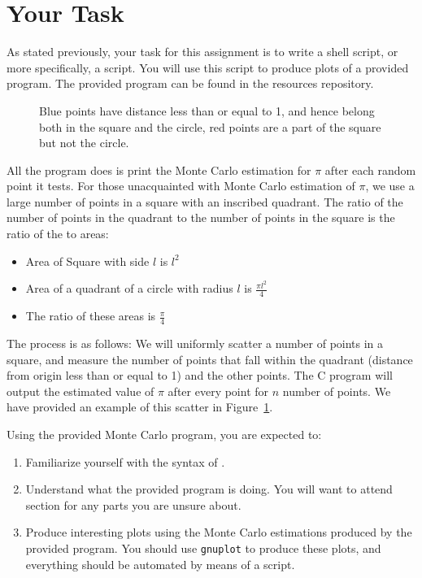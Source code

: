 \section{Your Task}

As stated previously, your task for this assignment is to write a shell script,
or more specifically, a \Bash{} script. You will use this script to
produce plots of a provided \C{} program. The provided program can be
found in the resources repository.

\begin{figure}[bth]
  \centering
  
  \caption{\label{figure:monte_carlo_grid}
    Blue points have distance less than or equal to 1, and hence belong both in the square and the circle, red points are a part of the square but not the circle.
  }
\end{figure}


All the program does is print the Monte Carlo estimation for $\pi$ after each random point it tests. For those unacquainted with Monte Carlo estimation of $\pi$, we use a large number of points
in a square with an inscribed quadrant. The ratio of the number of points in the quadrant to the number of points in the square is the ratio of the to areas:
\begin{itemize}
  \item Area of Square with side $l$ is $l^2$
  \item Area of a quadrant of a circle with radius $l$ is $\frac{\pi l^2}{4}$
  \item The ratio of these areas is $\frac{\pi}{4}$
\end{itemize}
The process is as follows: We will uniformly scatter a number of points in a square, and measure the number of points that fall within the quadrant (distance from origin less than or equal to 1) and the other points. The C program will output the estimated value of $\pi$ after every point for $n$ number of points. We have provided an example of this scatter in Figure~\ref*{figure:monte_carlo_grid}.

Using the provided Monte Carlo program, you are expected to:
\begin{enumerate}
  \item Familiarize yourself with the syntax of \C{}.
  \item Understand what the provided program is doing. You will want to attend
    section for any parts you are unsure about.
  \item Produce interesting plots using the Monte Carlo estimations produced by the
    provided program. You should use \texttt{gnuplot} to produce these plots,
    and everything should be automated by means of a \Bash{} script.
\end{enumerate}


